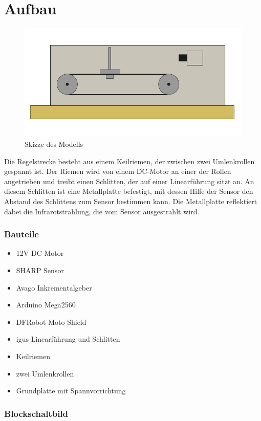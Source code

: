 \documentclass[a4paper]{report}
\begin{document}
\chapter{Aufbau}
\begin{figure}[h]
\includegraphics[width=\textwidth]{img/position_control_sheme.pdf}
\caption{Skizze des Modells}
\end{figure}
Die Regelstrecke besteht aus einem Keilriemen, der zwischen zwei Umlenkrollen gespannt ist. Der Riemen wird von einem DC-Motor an einer der Rollen angetrieben und treibt einen Schlitten, der auf einer Linearf\"uhrung sitzt an. An diesem Schlitten ist eine Metallplatte befestigt, mit dessen Hilfe der Sensor den Abstand des Schlittens zum Sensor bestimmen kann. Die Metallplatte reflektiert dabei die Infrarotstrahlung, die vom Sensor ausgestrahlt wird.
\subsection{Bauteile}
\begin{itemize}
\item 12V DC Motor
\item SHARP Sensor
\item Avago Inkrementalgeber
\item Arduino Mega2560
\item DFRobot Moto Shield
\item igus Linearf\"uhrung und Schlitten
\item Keilriemen
\item zwei Umlenkrollen
\item Grundplatte mit Spannvorrichtung
\end{itemize}
\subsection{Blockschaltbild}
\end{document}
